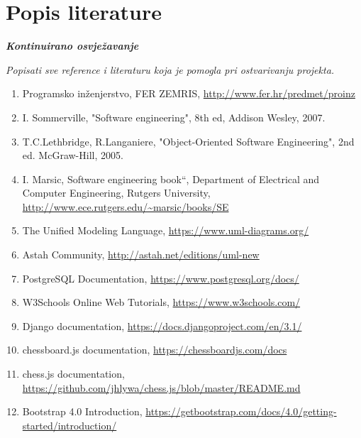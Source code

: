 \chapter*{Popis literature}
	 	
 		\textbf{\textit{Kontinuirano osvježavanje}}
	
		\textit{Popisati sve reference i literaturu koja je pomogla pri ostvarivanju projekta.}
		
		
		\begin{enumerate}
			
			
			\item  Programsko inženjerstvo, FER ZEMRIS, \url{http://www.fer.hr/predmet/proinz}
			
			\item  I. Sommerville, "Software engineering", 8th ed, Addison Wesley, 2007.
			
			\item  T.C.Lethbridge, R.Langaniere, "Object-Oriented Software Engineering", 2nd ed. McGraw-Hill, 2005.
			
			\item  I. Marsic, Software engineering book``, Department of Electrical and Computer Engineering, Rutgers University, \url{http://www.ece.rutgers.edu/~marsic/books/SE}
			
			\item  The Unified Modeling Language, \url{https://www.uml-diagrams.org/}
			
			\item  Astah Community, \url{http://astah.net/editions/uml-new}
			
			\item PostgreSQL Documentation, \url{https://www.postgresql.org/docs/}
			
			\item W3Schools Online Web Tutorials, \url{https://www.w3schools.com/}
			
			\item Django documentation, \url{https://docs.djangoproject.com/en/3.1/}
			
			\item chessboard.js documentation, \url{https://chessboardjs.com/docs}
			
			\item chess.js documentation, \url{https://github.com/jhlywa/chess.js/blob/master/README.md}
			
			\item Bootstrap 4.0 Introduction, \url{https://getbootstrap.com/docs/4.0/getting-started/introduction/}
			
		\end{enumerate}
		
		 